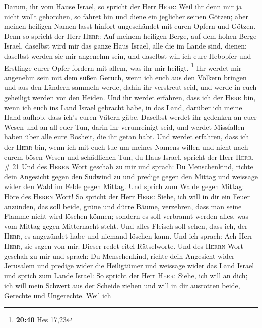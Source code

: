  Darum, ihr vom Hause Israel, so spricht der Herr
\textsc{Herr}: Weil ihr denn mir ja nicht wollt gehorchen, so fahret hin
und diene ein jeglicher seinen Götzen; aber meinen heiligen Namen lasst
hinfort ungeschändet mit euren Opfern und Götzen.  Denn
so spricht der Herr \textsc{Herr}: Auf meinem heiligen Berge, auf dem
hohen Berge Israel, daselbst wird mir das ganze Haus Israel, alle die im
Lande sind, dienen; daselbst werden sie mir angenehm sein, und daselbst
will ich eure Hebopfer und Erstlinge eurer Opfer fordern mit allem, was
ihr mir heiligt. \footnote{\textbf{20:40} Hes 17,23}  Ihr
werdet mir angenehm sein mit dem süßen Geruch, wenn ich euch aus den
Völkern bringen und aus den Ländern sammeln werde, dahin ihr verstreut
seid, und werde in euch geheiligt werden vor den Heiden. 
Und ihr werdet erfahren, dass ich der \textsc{Herr} bin, wenn ich euch
ins Land Israel gebracht habe, in das Land, darüber ich meine Hand
aufhob, dass ich's euren Vätern gäbe.  Daselbst werdet
ihr gedenken an euer Wesen und an all euer Tun, darin ihr verunreinigt
seid, und werdet Missfallen haben über alle eure Bosheit, die ihr getan
habt.  Und werdet erfahren, dass ich der \textsc{Herr}
bin, wenn ich mit euch tue um meines Namens willen und nicht nach eurem
bösen Wesen und schädlichen Tun, du Haus Israel, spricht der Herr
\textsc{Herr}. \# 21  Und des \textsc{Herrn} Wort geschah
zu mir und sprach:  Du Menschenkind, richte dein Angesicht
gegen den Südwind zu und predige gegen den Mittag und weissage wider den
Wald im Felde gegen Mittag.  Und sprich zum Walde gegen
Mittag: Höre des \textsc{Herrn} Wort! So spricht der Herr \textsc{Herr}:
Siehe, ich will in dir ein Feuer anzünden, das soll beide, grüne und
dürre Bäume, verzehren, dass man seine Flamme nicht wird löschen können;
sondern es soll verbrannt werden alles, was vom Mittag gegen Mitternacht
steht.  Und alles Fleisch soll sehen, dass ich, der
\textsc{Herr}, es angezündet habe und niemand löschen kann.
 Und ich sprach: Ach Herr \textsc{Herr}, sie sagen von
mir: Dieser redet eitel Rätselworte.  Und des
\textsc{Herrn} Wort geschah zu mir und sprach:  Du
Menschenkind, richte dein Angesicht wider Jerusalem und predige wider
die Heiligtümer und weissage wider das Land Israel  und
sprich zum Lande Israel: So spricht der Herr \textsc{Herr}: Siehe, ich
will an dich; ich will mein Schwert aus der Scheide ziehen und will in
dir ausrotten beide, Gerechte und Ungerechte.  Weil ich
